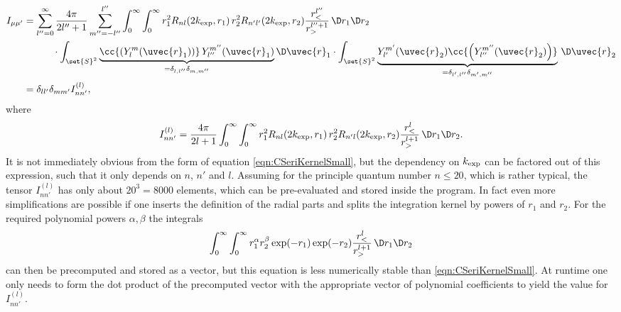 \begin{equation}
\begin{aligned}
	I_{\mu\mu'}
	&= \sum_{l''=0}^{\infty}\frac{4\pi}{2l''+1}
	\sum_{m''=-l''}^{l''}
	\int_0^\infty \int_0^\infty
	r_1^2 R_{nl}(2\kexp,r_1) \, r_2^2 R_{n'l'}(2\kexp,r_2) \frac{r^{l''}_<}{r_>^{l'' + 1}}
	\, \D r_1  \D r_2 \\
	&\hspace{30pt}
	\cdot \int_{\set{S}^2}
		\underbrace{\cc{\left(Y_l^m(\uvec{r}_1)\right)} \, Y_{l''}^{m''}(\uvec{r}_1)}
		_{=\delta_{l,l''}\delta_{m,m''}}
		\D \uvec{r}_1
	\cdot \int_{\set{S}^2}
		\underbrace{Y_{l'}^{m'}(\uvec{r}_2) \cc{\left(Y_{l''}^{m''}(\uvec{r}_2)\right)}}
		_{=\delta_{l',l''}\delta_{m',m''}}
		\, \D \uvec{r}_2 \\
	&= \delta_{ll'} \delta_{mm'} I^{(l)}_{nn'},
\end{aligned}
\label{eqn:CSeriKernel}
\end{equation}
where
\begin{equation}
	I^{(l)}_{nn'}
	= \frac{4\pi}{2l+1}
	\int_0^\infty \int_0^\infty
	r_1^2 R_{nl}(2\kexp,r_1) \, r_2^2 R_{n'l}(2\kexp,r_2) \frac{r^{l}_<}{r_>^{l + 1}}
	\, \D r_1  \D r_2.
	\label{eqn:CSeriKernelSmall}
\end{equation}
It is not immediately obvious from the form of equation \eqref{eqn:CSeriKernelSmall},
but the dependency on $k_\text{exp}$ can be factored out of this expression,
such that it only depends on $n$, $n'$ and $l$.
Assuming for the principle quantum number $n \leq 20$, which is rather typical,
the tensor $I^{(l)}_{nn'}$ has only about $20^3 = 8000$ elements,
which can be pre-evaluated and stored inside the program.
In fact even more simplifications are possible if one inserts
the definition of the radial parts and splits the integration kernel by powers of
$r_1$ and $r_2$.
For the required polynomial powers $\alpha, \beta$ the integrals
\[ \int_0^\infty \int_0^\infty r_1^\alpha r_2^\beta \exp(-r_1) \exp(-r_2)
	\frac{r^{l}_<}{r_>^{l + 1}} \, \D r_1  \D r_2 \]
can then be precomputed and stored as a vector,
but this equation is less numerically stable than \eqref{eqn:CSeriKernelSmall}.
At runtime one only needs to form the dot product of the precomputed vector
with the appropriate vector of polynomial coefficients
to yield the value for $I^{(l)}_{nn'}$.

